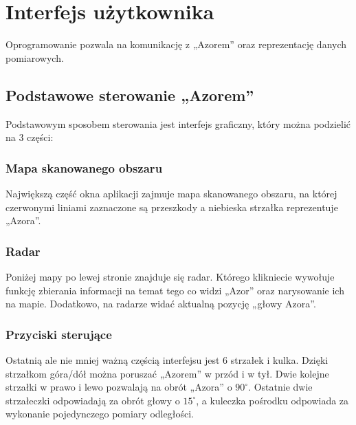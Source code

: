 \section{Interfejs użytkownika}
    \tab Oprogramowanie pozwala na komunikację z „Azorem” oraz reprezentację danych pomiarowych.

    

    \subsection{Podstawowe sterowanie „Azorem”}
        \tab Podstawowym sposobem sterowania jest interfejs graficzny, który można podzielić na 3 części:

        \subsubsection{Mapa skanowanego obszaru}        
            \tab Największą część okna aplikacji zajmuje mapa skanowanego obszaru, 
            na której czerwonymi liniami zaznaczone są przeszkody a niebieska strzałka reprezentuje „Azora”.

        \subsubsection{Radar}
            \tab Poniżej mapy po lewej stronie znajduje się radar. 
            Którego klikniecie wywołuje funkcję zbierania informacji na temat tego co widzi „Azor” oraz narysowanie ich na mapie. 
            Dodatkowo, na radarze widać aktualną pozycję „głowy Azora”.
        
        \subsubsection{Przyciski sterujące}
            \tab Ostatnią ale nie mniej ważną częścią interfejsu jest 6 strzałek i kulka. 
            Dzięki strzałkom góra/dół można poruszać „Azorem” w przód i w tył.
            Dwie kolejne strzałki w prawo i lewo pozwalają na obrót „Azora” o $90^\circ$.
            Ostatnie dwie strzałeczki odpowiadają za obrót głowy o $15^\circ$, a kuleczka pośrodku odpowiada za wykonanie pojedynczego pomiary odległości.


    
    \newpage
